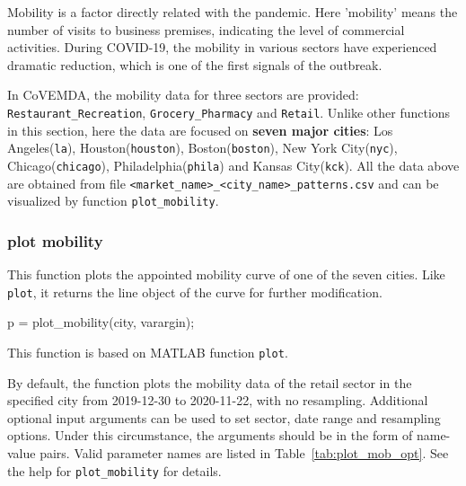 \documentclass[11pt]{article}
\newcommand{\covemda}{CoVEMDA}
\newcommand{\matlab}{\textsc{MATLAB}}
\numberwithin{equation}{section}
\numberwithin{table}{section}
\numberwithin{figure}{section}
\begin{document}
Mobility is a factor directly related with the pandemic. Here 'mobility' means the number of visits to business premises, indicating the level of commercial activities. During COVID-19, the mobility in various sectors have experienced dramatic reduction, which is one of the first signals of the outbreak.

In \covemda{}, the mobility data for three sectors are provided: \verb!Restaurant_Recreation!, \verb!Grocery_Pharmacy! and \verb!Retail!. Unlike other functions in this section, here the data are focused on \textbf{seven major cities}: Los Angeles(\verb!la!), Houston(\verb!houston!), Boston(\verb!boston!), New York City(\verb!nyc!), Chicago(\verb!chicago!), Philadelphia(\verb!phila!) and Kansas City(\verb!kck!). All the data above are obtained from file \verb!<market_name>_<city_name>_patterns.csv! and can be visualized by function \verb!plot_mobility!.

\subsubsection{plot mobility}

This function plots the appointed mobility curve of one of the seven cities. Like \verb!plot!, it returns the line object of the curve for further modification.

\begin{Code}
  p = plot_mobility(city, varargin);
\end{Code}

This function is based on \matlab{} function \verb!plot!.

By default, the function plots the mobility data of the retail sector in the specified city from 2019-12-30 to 2020-11-22, with no resampling. Additional optional input arguments can be used to set sector, date range and resampling options. Under this circumstance, the arguments should be in the form of name-value pairs. Valid parameter names are listed in Table~\ref{tab:plot_mob_opt}. See the help for \verb!plot_mobility! for details.
\end{document}
